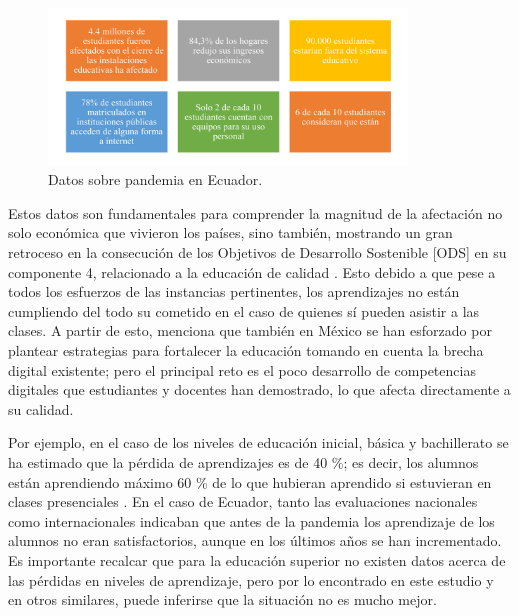 \documentclass[spanish]{textolivre}
\begin{document}
\begin{figure}[htbp]
 \centering
 \includegraphics[width=0.85\textwidth]{Fig01.jpg}
 \caption{Datos sobre pandemia en Ecuador.}
 \label{Fig01}
\end{figure}

Estos datos son fundamentales para comprender la magnitud de la afectación no solo económica que vivieron los países, sino también, mostrando un gran retroceso en la consecución de los Objetivos de Desarrollo Sostenible [ODS] en su componente 4, relacionado a la educación de calidad \cite{organizacion_de_las_naciones_unidas_[onu]_objetivos_2012}. Esto debido a que pese a todos los esfuerzos de las instancias pertinentes, los aprendizajes no están cumpliendo del todo su cometido en el caso de quienes sí pueden asistir a las clases. A partir de esto, \textcite{miguel_roman_educacion_2020} menciona que también en México se han esforzado por plantear estrategias para fortalecer la educación tomando en cuenta la brecha digital existente; pero el principal reto es el poco desarrollo de competencias digitales que estudiantes y docentes han demostrado, lo que afecta directamente a su calidad.

Por ejemplo, en el caso de los niveles de educación inicial, básica y bachillerato se ha estimado que la pérdida de aprendizajes es de 40 \%; es decir, los alumnos están aprendiendo máximo 60 \% de lo que hubieran aprendido si estuvieran en clases presenciales \cite{unesco_bid_2020}. En el caso de Ecuador, tanto las evaluaciones nacionales como internacionales indicaban que antes de la pandemia los aprendizaje de los alumnos no eran satisfactorios, aunque en los últimos años se han incrementado. Es importante recalcar que para la educación superior no existen datos acerca de las pérdidas en niveles de aprendizaje, pero por lo encontrado en este estudio y en otros similares, puede inferirse que la situación no es mucho mejor.
\end{document}
